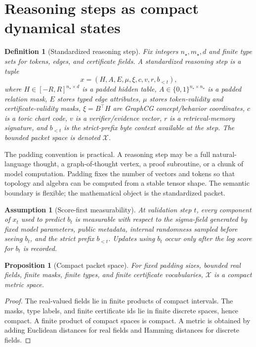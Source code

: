 \documentclass[10pt]{article}
\newtheorem{proposition}[theorem]{Proposition}
\newtheorem{definition}[theorem]{Definition}
\newtheorem{assumption}[theorem]{Assumption}
\newcommand{\calX}{\mathcal{X}}
\numberwithin{equation}{section}
\begin{document}
\section{Reasoning steps as compact dynamical states}
\begin{definition}[Standardized reasoning step]
Fix integers $n_\star,m_\star,d$ and finite type sets for tokens, edges, and certificate fields. A standardized reasoning step is a tuple
\begin{equation}
x=(H,A,E,\mu,\xi,c,v,r,b_{<t}),
\end{equation}
where $H\in[-R,R]^{n_\star\times d}$ is a padded hidden table, $A\in\{0,1\}^{n_\star\times n_\star}$ is a padded relation mask, $E$ stores typed edge attributes, $\mu$ stores token-validity and certificate-validity masks, $\xi=B^\top H$ are GraphCG concept/behavior coordinates, $c$ is a toric chart code, $v$ is a verifier/evidence vector, $r$ is a retrieval-memory signature, and $b_{<t}$ is the strict-prefix byte context available at the step. The bounded packet space is denoted $\calX$.
\end{definition}

The padding convention is practical. A reasoning step may be a full natural-language thought, a graph-of-thought vertex, a proof subroutine, or a chunk of model computation. Padding fixes the number of vectors and tokens so that topology and algebra can be computed from a stable tensor shape. The semantic boundary is flexible; the mathematical object is the standardized packet.

\begin{assumption}[Score-first measurability]
At validation step $t$, every component of $x_t$ used to predict $b_t$ is measurable with respect to the sigma-field generated by fixed model parameters, public metadata, internal randomness sampled before seeing $b_t$, and the strict prefix $b_{<t}$. Updates using $b_t$ occur only after the log score for $b_t$ is recorded.
\end{assumption}

\begin{proposition}[Compact packet space]
For fixed padding sizes, bounded real fields, finite masks, finite types, and finite certificate vocabularies, $\calX$ is a compact metric space.
\end{proposition}
\begin{proof}
The real-valued fields lie in finite products of compact intervals. The masks, type labels, and finite certificate ids lie in finite discrete spaces, hence compact. A finite product of compact spaces is compact. A metric is obtained by adding Euclidean distances for real fields and Hamming distances for discrete fields.
\end{proof}
\end{document}
